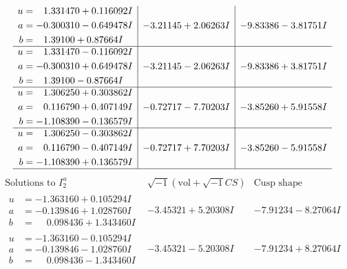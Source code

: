 \documentclass[1p]{elsarticle_modified}
\theoremstyle{definition}
\newcommand{\I}{\sqrt{-1}}
\begin{document}
$$\begin{array}{c|c|c}
\begin{aligned}
u &= \phantom{-}1.331470 + 0.116092 I \\
a &= -0.300310 - 0.649478 I \\
b &= \phantom{-}1.39100 + 0.87664 I\end{aligned}
 & -3.21145 + 2.06263 I & -9.83386 - 3.81751 I \\ \hline\begin{aligned}
u &= \phantom{-}1.331470 - 0.116092 I \\
a &= -0.300310 + 0.649478 I \\
b &= \phantom{-}1.39100 - 0.87664 I\end{aligned}
 & -3.21145 - 2.06263 I & -9.83386 + 3.81751 I \\ \hline\begin{aligned}
u &= \phantom{-}1.306250 + 0.303862 I \\
a &= \phantom{-}0.116790 + 0.407149 I \\
b &= -1.108390 - 0.136579 I\end{aligned}
 & -0.72717 - 7.70203 I & -3.85260 + 5.91558 I \\ \hline\begin{aligned}
u &= \phantom{-}1.306250 - 0.303862 I \\
a &= \phantom{-}0.116790 - 0.407149 I \\
b &= -1.108390 + 0.136579 I\end{aligned}
 & -0.72717 + 7.70203 I & -3.85260 - 5.91558 I\\
 \hline 
 \end{array}$$\newpage$$\begin{array}{c|c|c}  
\text{Solutions to }I^u_{2}& \I (\text{vol} + \sqrt{-1}CS) & \text{Cusp shape}\\
 \hline 
\begin{aligned}
u &= -1.363160 + 0.105294 I \\
a &= -0.139846 + 1.028760 I \\
b &= \phantom{-}0.098436 + 1.343460 I\end{aligned}
 & -3.45321 + 5.20308 I & -7.91234 - 8.27064 I \\ \hline\begin{aligned}
u &= -1.363160 - 0.105294 I \\
a &= -0.139846 - 1.028760 I \\
b &= \phantom{-}0.098436 - 1.343460 I\end{aligned}
 & -3.45321 - 5.20308 I & -7.91234 + 8.27064 I \\ \hline\begin{aligned}

\end{aligned}
\end{array}$$
\end{document}
